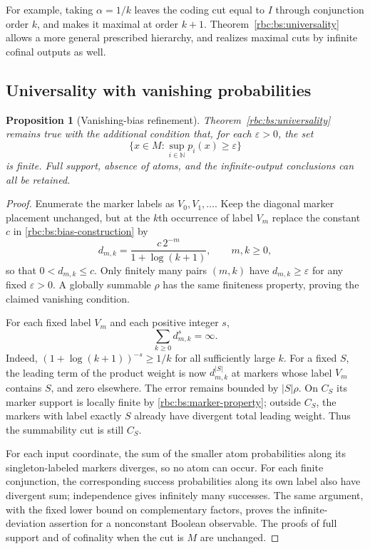 \documentclass[11pt]{article}
\numberwithin{equation}{section}
\newtheorem{proposition}[theorem]{Proposition}
\theoremstyle{definition}
\theoremstyle{remark}
\newcommand{\N}{\mathbb N}
\begin{document}
For example, taking $\alpha=1/k$ leaves the coding cut equal to $I$
through conjunction order $k$, and makes it maximal at order $k+1$.
Theorem~\ref{rbc:bs:universality} allows a more general prescribed hierarchy,
and realizes maximal cuts by infinite cofinal outputs as well.

\subsection{Universality with vanishing probabilities}

\begin{proposition}[Vanishing-bias refinement]
\label{rbc:bs:vanishing}
Theorem~\ref{rbc:bs:universality} remains true with the additional condition
that, for each $\varepsilon>0$, the set
\[
  \{x\in M:\sup_{i\in\N}p_i(x)\geq\varepsilon\}
\]
is finite.  Full support, absence of atoms, and the infinite-output
conclusions can all be retained.
\end{proposition}

\begin{proof}
Enumerate the marker labels as $V_0,V_1,\ldots$.  Keep the diagonal
marker placement unchanged, but at the $k$th occurrence of label $V_m$
replace the constant $c$ in \eqref{rbc:bs:bias-construction} by
\[
  d_{m,k}=\frac{c\,2^{-m}}{1+\log(k+1)},
  \qquad m,k\geq0,
\]
so that $0<d_{m,k}\leq c$.  Only finitely many pairs $(m,k)$ have
$d_{m,k}\geq\varepsilon$ for any fixed $\varepsilon>0$.  A globally
summable $\rho$ has the same finiteness property, proving the claimed
vanishing condition.

For each fixed label $V_m$ and each positive integer $s$,
\[
  \sum_{k\geq0}d_{m,k}^{s}=\infty.
\]
Indeed, $(1+\log(k+1))^{-s}\geq1/k$ for all sufficiently large $k$.
For a fixed $S$, the leading term of the product weight is now
$d_{m,k}^{|S|}$ at markers whose label $V_m$ contains $S$, and zero
elsewhere.  The error remains bounded by $|S|\rho$.  On $C_S$ its marker
support is locally finite by \eqref{rbc:bs:marker-property}; outside $C_S$,
the markers with label exactly $S$ already have divergent total leading
weight.  Thus the summability cut is still $C_S$.

For each input coordinate, the sum of the smaller atom probabilities
along its singleton-labeled markers diverges, so no atom can occur.
For each finite conjunction, the corresponding success probabilities
along its own label also have divergent sum; independence gives
infinitely many successes.  The same argument, with the fixed lower
bound on complementary factors, proves the infinite-deviation assertion
for a nonconstant Boolean observable.  The proofs of full support and of
cofinality when the cut is $M$ are unchanged.
\end{proof}
\end{document}
